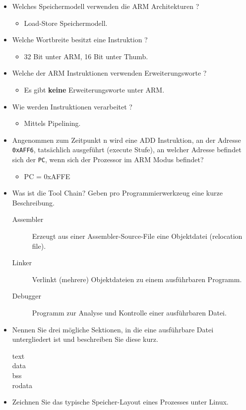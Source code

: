\documentclass[12pt]{article}
\begin{document}
\begin{itemize}
 \item Welches Speichermodell verwenden die ARM Architekturen ?
     \begin{itemize}
        \item Load-Store Speichermodell.
     \end{itemize}
 \item Welche Wortbreite besitzt eine Instruktion ?
     \begin{itemize}
        \item 32 Bit unter ARM, 16 Bit unter Thumb.
     \end{itemize}
 \item Welche der ARM Instruktionen verwenden Erweiterungsworte ?
     \begin{itemize}
         \item Es gibt \textbf{keine} Erweiterungsworte unter ARM.
     \end{itemize}
 \item Wie werden Instruktionen verarbeitet ?
     \begin{itemize}
         \item Mittels Pipelining.
     \end{itemize}
 \item Angenommen zum Zeitpunkt n wird eine ADD Instruktion, an der Adresse
     \texttt{0xAFF6}, tatsächlich ausgeführt (execute Stufe), an welcher Adresse befindet sich
        der \texttt{PC}, wenn sich der Prozessor im ARM Modus befindet?
     \begin{itemize}
         \item PC = 0xAFFE
     \end{itemize}
 \item Was ist die Tool Chain? Geben pro Programmierwerkzeug eine kurze
     Beschreibung.
     \begin{description}
         \item [Assembler] Erzeugt aus einer Assembler-Source-File eine
             Objektdatei (relocation file).
         \item [Linker] Verlinkt (mehrere) Objektdateien zu einem ausführbaren
             Programm.
        \item [Debugger] Programm zur Analyse und Kontrolle einer ausführbaren
            Datei.
     \end{description}
 \item Nennen Sie drei mögliche Sektionen, in die eine ausführbare Datei
     untergliedert ist und beschreiben Sie diese kurz.
        \begin{description}
            \item [text]
            \item [data]
            \item [bss]
            \item [rodata]
        \end{description}
 \item Zeichnen Sie das typische Speicher-Layout eines Prozesses unter Linux.
\end{itemize}
\end{document}
